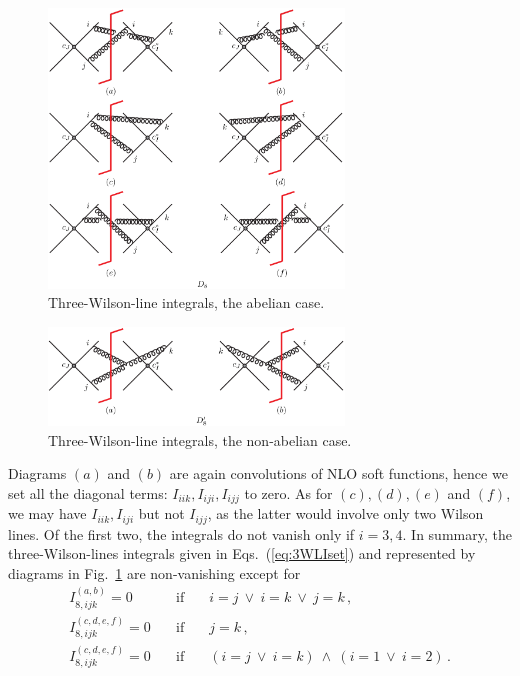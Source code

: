 \documentclass[a4paper,11pt]{report}
\numberwithin{equation}{section}
\begin{document}
\begin{figure}[t]
  \begin{center}
    \includegraphics[width=0.7\textwidth]{plots/diagram3-pecjak.png}
  \end{center}
  \caption{
    Three-Wilson-line integrals, the abelian case.
  }
  \label{fig:pecjak3}
\end{figure}
%
\begin{figure}[t]
  \begin{center}
    \includegraphics[width=0.7\textwidth]{plots/diagram5-pecjak.png}
  \end{center}
  \caption{
    Three-Wilson-line integrals, the non-abelian case.
  }
  \label{fig:pecjak5}
\end{figure}

Diagrams $(a)$ and $(b)$ are again convolutions of NLO soft functions, hence we
set all the diagonal terms: $I_{iik}, I_{iji}, I_{ijj}$ to zero. 
%
As for $(c), (d), (e)$ and $(f)$, we may have $I_{iik}, I_{iji}$ but not
$I_{ijj}$, as the latter would involve only two Wilson lines. Of the first two,
the integrals do not vanish only if $i=3,4$. In summary, the three-Wilson-lines
integrals given in Eqs.~(\ref{eq:3WLIset}) and represented by diagrams in
Fig.~\ref{fig:pecjak3} are non-vanishing except for
%
\begin{equation}
  \begin{array}{ccc}
  I^{(a,b)}_{8,ijk} = 0     & \quad \text{if} \quad & 
                               i=j\ \lor\ i=k\ \lor\ j=k\,,
  \\[0.5em]
  I^{(c,d,e,f)}_{8,ijk} = 0 & \quad \text{if} \quad & j=k\,,
  \\[0.5em]
  I^{(c,d,e,f)}_{8,ijk} = 0 & \quad \text{if} \quad & 
                              (i=j\ \lor\ i=k)\ \land\ (i=1\ \lor\ i=2)\,.
  \end{array}
\end{equation}
\end{document}
